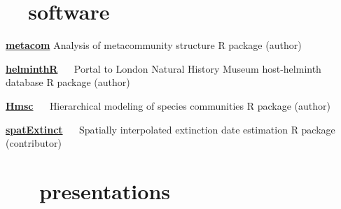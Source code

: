 \documentclass[]{CV}
\begin{document}
\section{\faCode \ \  software}
\begin{entrylist}
 \entry
 {\href{http://cran.r-project.org/web/packages/metacom/}{\textbf{metacom}}}
 {Analysis of metacommunity structure} 
 {R package (author)}

 \entry
 {\href{http://github.com/ropensci/helminthR}{\textbf{helminthR}} \ \ }
 {Portal to London Natural History Museum host-helminth database}
 {R package (author)}

 \entry
 {\href{https://github.com/hmsc-r/HMSC}{\textbf{Hmsc}} \ \ }
 {Hierarchical modeling of species communities}
 {R package (author)}

 \entry
 {\href{http://github.com/cjcarlson/spatExtinct}{\textbf{spatExtinct}} \ \ }
 {Spatially interpolated extinction date estimation}
 {R package (contributor)}

\end{entrylist}





\section{\faVideoCamera \ \ \ presentations}
\end{document}
